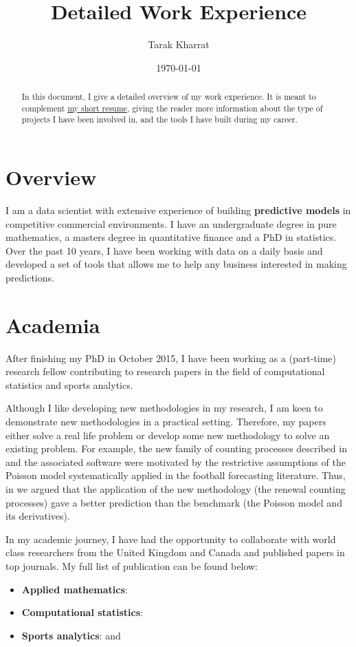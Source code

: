 \documentclass[11pt]{article}
\author{Tarak Kharrat}
\date{\today}
\title{Detailed Work Experience}
\begin{document}
\maketitle
\begin{abstract}
In this document, I give a detailed overview of my work experience. It is
meant to complement \href{https://liverpool.academia.edu/TarakKharrat/CurriculumVitae}{my short resume}, giving the reader more information
about the type of projects I have been involved in, and the
tools I have built during my career.
\end{abstract}

\tableofcontents \clearpage

\section{Overview}
\label{sec:orgb7cee5c}
I am a data scientist with extensive experience of building \textbf{\textbf{predictive
models}} in competitive commercial environments. I have an undergraduate degree
in pure mathematics, a masters degree in quantitative finance and a PhD in
statistics. Over the past 10 years, I have been working with data on a daily
basis and developed a set of tools that allows me to help any business
interested in making predictions.

\section{Academia}
\label{sec:orgb27c479}
After finishing my PhD in October 2015, I have been working as a (part-time)
research fellow contributing to research papers in the field of computational
statistics and sports analytics.

Although I like developing new methodologies in my research, I am keen to
demonstrate new methodologies in a practical setting. Therefore, my papers
either solve a real life problem or develop some new methodology to solve an
existing problem. For example, the new family of counting processes described in
\cite{baker2018event} and the associated software \cite{kharrat2019flexible} were
motivated by the restrictive assumptions of the Poisson model systematically
applied in the football forecasting literature. Thus, in
\cite{boshnakov2017bivariate} we argued that the application of the new
methodology (the renewal counting processes) gave a better prediction than the
benchmark (the Poisson model and its derivatives).

In my academic journey, I have had the opportunity to collaborate with world class
researchers from the United Kingdom and Canada and published papers in top
journals. My full list of publication can be found below: 
\begin{itemize}
\item \textbf{Applied mathematics}: \cite{heil2012quasi}
\item \textbf{Computational statistics}: \cite{baker2018event,kharrat2019flexible}
\item \textbf{Sports analytics}: \cite{boshnakov2017bivariate,kharrat2019plus} and
\cite{kharrat20deep}
\end{itemize}
\end{document}
